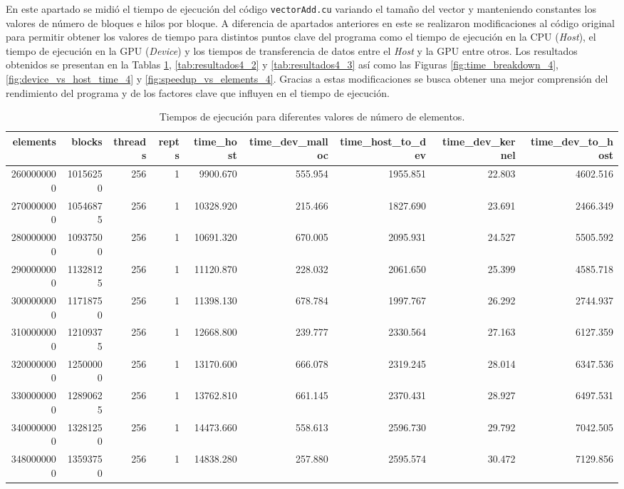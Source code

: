 \documentclass{article}
\begin{document}
			En este apartado se midió el tiempo de ejecución del código \texttt{vectorAdd.cu} variando el tamaño del vector y manteniendo constantes los valores de número de bloques e hilos por bloque. A diferencia de apartados anteriores en este se realizaron modificaciones al código original para permitir obtener los valores de tiempo para distintos puntos clave del programa como el tiempo de ejecución en la CPU (\textit{Host}), el tiempo de ejecución en la GPU (\textit{Device}) y los tiempos de transferencia de datos entre el \textit{Host} y la GPU entre otros. Los resultados obtenidos se presentan en la Tablas \ref{tab:resultados4_1}, \ref{tab:resultados4_2} y \ref{tab:resultados4_3} así como las Figuras \ref{fig:time_breakdown_4}, \ref{fig:device_vs_host_time_4} y \ref{fig:speedup_vs_elements_4}. Gracias a estas modificaciones se busca obtener una mejor comprensión del rendimiento del programa y de los factores clave que influyen en el tiempo de ejecución.

			\begin{table}[H]
				\begin{adjustbox}{width=\textwidth, height=\textheight, keepaspectratio}
					\begin{tabular}{|r|r|r|r|r|r|r|r|r|}
						\hline
						elements & blocks & threads & repts & time\_host & time\_dev\_malloc & time\_host\_to\_dev & time\_dev\_kernel & time\_dev\_to\_host \\ \hline
						2600000000 & 10156250 & 256 & 1 & 9900.670 & 555.954 & 1955.851 & 22.803 & 4602.516 \\ \hline
						2700000000 & 10546875 & 256 & 1 & 10328.920 & 215.466 & 1827.690 & 23.691 & 2466.349 \\ \hline
						2800000000 & 10937500 & 256 & 1 & 10691.320 & 670.005 & 2095.931 & 24.527 & 5505.592 \\ \hline
						2900000000 & 11328125 & 256 & 1 & 11120.870 & 228.032 & 2061.650 & 25.399 & 4585.718 \\ \hline
						3000000000 & 11718750 & 256 & 1 & 11398.130 & 678.784 & 1997.767 & 26.292 & 2744.937 \\ \hline
						3100000000 & 12109375 & 256 & 1 & 12668.800 & 239.777 & 2330.564 & 27.163 & 6127.359 \\ \hline
						3200000000 & 12500000 & 256 & 1 & 13170.600 & 666.078 & 2319.245 & 28.014 & 6347.536 \\ \hline
						3300000000 & 12890625 & 256 & 1 & 13762.810 & 661.145 & 2370.431 & 28.927 & 6497.531 \\ \hline
						3400000000 & 13281250 & 256 & 1 & 14473.660 & 558.613 & 2596.730 & 29.792 & 7042.505 \\ \hline
						3480000000 & 13593750 & 256 & 1 & 14838.280 & 257.880 & 2595.574 & 30.472 & 7129.856 \\ \hline
					\end{tabular}
				\end{adjustbox}
				\caption{Tiempos de ejecución para diferentes valores de número de elementos.}
				\label{tab:resultados4_1}
			\end{table}
\end{document}
